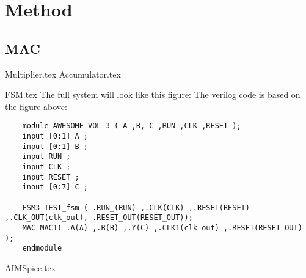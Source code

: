 \section{Method}
\subsection{MAC} 
{Multiplier.tex}
{Accumulator.tex}


{FSM.tex}
The full system will look like this figure: 
The verilog code is based on the figure above: 
\begin{lstlisting}
    module AWESOME_VOL_3 ( A ,B, C ,RUN ,CLK ,RESET );	
    input [0:1] A ;
    input [0:1] B ;
    input RUN ;
    input CLK ;
    input RESET ;
    inout [0:7] C ; 
    
    FSM3 TEST_fsm ( .RUN_(RUN) ,.CLK(CLK) ,.RESET(RESET) ,.CLK_OUT(clk_out), .RESET_OUT(RESET_OUT));
    MAC MAC1( .A(A) ,.B(B) ,.Y(C) ,.CLK1(clk_out) ,.RESET(RESET_OUT) );   
    endmodule
\end{lstlisting}

{AIMSpice.tex}

